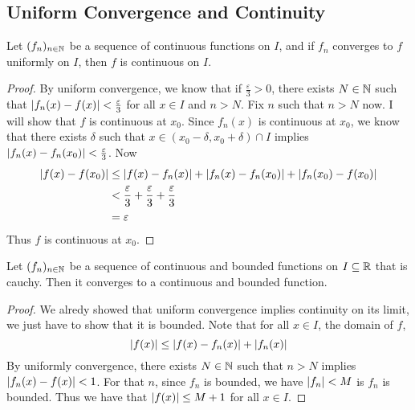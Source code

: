 \documentclass[a4paper]{article}
\begin{document}
\subsection{Uniform Convergence and Continuity}
\begin{thm}{}{} Let $(f_n)_{n\in\mathbb{N}}$ be a sequence of continuous functions on $I$, and if $f_n$ converges to $f$ uniformly on $I$, then $f$ is continuous on $I$. \tcbline
\begin{proof} By uniform convergence, we know that if $\frac{\varepsilon}{3}>0$, there exists $N\in\mathbb{N}$ such that $\abs{f_n(x)-f(x)}<\frac{\varepsilon}{3}$ for all $x\in I$ and $n>N$. Fix $n$ such that $n>N$ now. I will show that $f$ is continuous at $x_0$. Since $f_n(x)$ is continuous at $x_0$, we know that there exists $\delta$ such that $x\in(x_0-\delta,x_0+\delta)\cap I$ implies $\abs{f_n(x)-f_n(x_0)}<\frac{\varepsilon}{3}$. Now
\begin{align*}
\abs{f(x)-f(x_0)}&\leq\abs{f(x)-f_n(x)}+\abs{f_n(x)-f_n(x_0)}+\abs{f_n(x_0)-f(x_0)}\\
&<\frac{\varepsilon}{3}+\frac{\varepsilon}{3}+\frac{\varepsilon}{3}\\
&=\varepsilon
\end{align*}
Thus $f$ is continuous at $x_0$. 
\end{proof}
\end{thm}

\begin{prp}{}{} Let $(f_n)_{n\in\mathbb{N}}$ be a sequence of continuous and bounded functions on $I\subseteq\mathbb{R}$ that is cauchy. Then it converges to a continuous and bounded function. \tcbline
\begin{proof} We alredy showed that uniform convergence implies continuity on its limit, we just have to show that it is bounded. Note that for all $x\in I$, the domain of $f$, $$\abs{f(x)}\leq\abs{f(x)-f_n(x)}+\abs{f_n(x)}$$ By uniformly convergence, there exists $N\in\mathbb{N}$ such that $n>N$ implies $\abs{f_n(x)-f(x)}<1$. For that $n$, since $f_n$ is bounded, we have $\abs{f_n}<M$ is $f_n$ is bounded. Thus we have that $\abs{f(x)}\leq M+1$ for all $x\in I$. 
\end{proof}
\end{prp}
\end{document}
